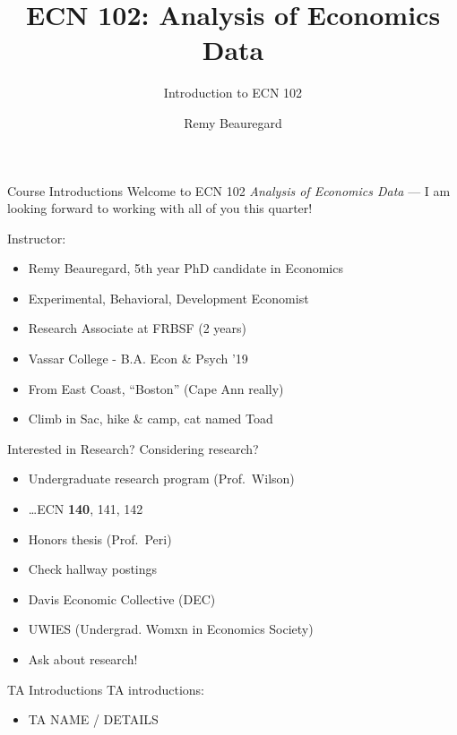\documentclass[
  ignorenonframetext,
  english,
]{beamer}
\title{\texorpdfstring{ECN 102: Analysis of Economics
Data}{ECN 102: Analysis of Economics Data}}
\subtitle{\texorpdfstring{Introduction to ECN
102}{Introduction to ECN 102}}
\author{Remy Beauregard}
\date{}
\providecommand{\tightlist}{%
  \setlength{\itemsep}{0pt}\setlength{\parskip}{0pt}}
\begin{document}
\frame{\titlepage}


\begin{frame}{Course Introductions}
\protect{}\label{course-introductions}
Welcome to ECN 102 \emph{Analysis of Economics Data} --- I am looking
forward to working with all of you this quarter!

Instructor:

\begin{itemize}
\item
  Remy Beauregard, 5th year PhD candidate in Economics
\item
  Experimental, Behavioral, Development Economist
\item
  Research Associate at FRBSF (2 years)
\item
  Vassar College - B.A. Econ \& Psych '19
\item
  From East Coast, ``Boston'' (Cape Ann really)
\item
  Climb in Sac, hike \& camp, cat named Toad
\end{itemize}
\end{frame}

\begin{frame}{Interested in Research?}
\protect{}\label{interested-in-research}
Considering research?

\begin{itemize}
\item
  Undergraduate research program (Prof.~Wilson)
\item
  \ldots ECN \textbf{140}, 141, 142
\item
  Honors thesis (Prof.~Peri)
\item
  Check hallway postings
\item
  Davis Economic Collective (DEC)
\item
  UWIES (Undergrad. Womxn in Economics Society)
\item
  Ask about research!
\end{itemize}
\end{frame}

\begin{frame}{TA Introductions}
\protect{}\label{ta-introductions}
TA introductions:

\begin{itemize}
\tightlist
\item
  TA NAME / DETAILS
\end{itemize}
\end{frame}
\end{document}
